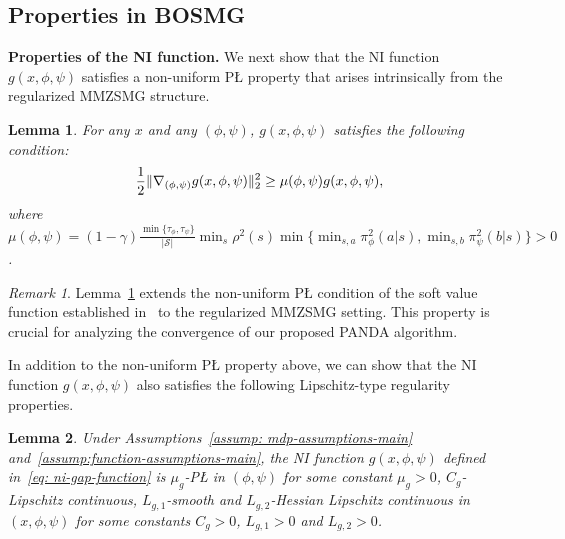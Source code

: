 \documentclass{article}
\theoremstyle{plain}
\newtheorem{lemma}{Lemma}
\theoremstyle{definition}
\theoremstyle{remark}
\newtheorem{remark}{Remark}
\def\cS{\mathcal S}
\begin{document}
\vspace{-1mm}
\subsection{Properties in BOSMG}
\vspace{-1mm}

{\bf Properties of the NI function.} 
We next show that the NI function $g(x,\phi,\psi)$ satisfies a non-uniform
P{\L} property that arises intrinsically from the regularized MMZSMG structure.
\begin{lemma}
    \label{lemma: ni-gap-non-uniform-pl-main}
    For any $x$ and any $(\phi,\psi)$, $g(x,\phi,\psi)$ satisfies the following condition:
    \vspace{-1mm}
    \begin{align}
        \frac{1}{2}\| \nabla_{(\phi,\psi)} g(x,\phi,\psi) \|_2^2 \geq \mu(\phi,\psi) g(x,\phi,\psi), 
        \vspace{-2mm}
    \end{align}
    where $\mu(\phi,\psi) = (1-\gamma)\frac{\min \{\tau_\phi,\tau_\psi\}}{|\cS|} \min_s \rho^2(s)  \allowbreak\min\{ \min_{s,a}\pi^2_\phi(a|s), \min_{s,b} \pi^2_\psi(b|s) \} > 0$.
\end{lemma}
\begin{remark}
    Lemma~\ref{lemma: ni-gap-non-uniform-pl-main} extends the non-uniform P{\L} condition of the soft value function established in~\citet{mei2020global} to the regularized MMZSMG setting. This property is crucial for analyzing the convergence of our proposed PANDA algorithm. 
\end{remark}

In addition to the non-uniform P{\L} property above, we can show that the NI
function $g(x,\phi,\psi)$ also satisfies the following Lipschitz-type
regularity properties.
\begin{lemma}
    \label{lemma: ni-gap-properties-main}
    Under Assumptions~\ref{assump: mdp-assumptions-main} and~\ref{assump:function-assumptions-main}, the NI function $g(x,\phi,\psi)$ defined in~\eqref{eq: ni-gap-function} is $\mu_g$-P{\L} in $(\phi,\psi)$ for some constant $\mu_g>0$, $C_g$-Lipschitz continuous, $L_{g,1}$-smooth and $L_{g,2}$-Hessian Lipschitz continuous in $(x,\phi,\psi)$ for some constants $C_g>0$, $L_{g,1}>0$ and $L_{g,2}>0$. 
\end{lemma}
\end{document}

